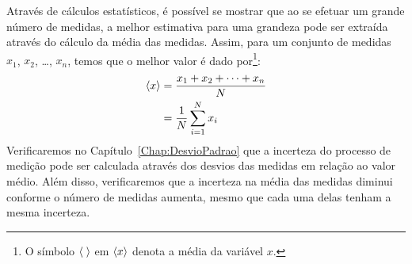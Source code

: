 \begin{description}
Através de cálculos estatísticos, é possível se mostrar que ao se efetuar um grande número de medidas, a melhor estimativa para uma grandeza pode ser extraída através do cálculo da média das medidas. Assim, para um conjunto de medidas $x_1$, $x_2$, \dots, $x_n$, temos que o melhor valor é dado por\footnote{O símbolo $\left\langle{\;}\right\rangle$ em $\left\langle{x}\right\rangle$ denota a média da variável $x$.}:
\begin{align}
	\left\langle{x}\right\rangle &= \frac{x_1 + x_2 + \dots + x_n}{N} \\
		&= \frac{1}{N}\sum_{i=1}^{N} x_i
\end{align}
%
Verificaremos no Capítulo~\ref{Chap:DesvioPadrao} que a incerteza do processo de medição pode ser calculada através dos desvios das medidas em relação ao valor médio. Além disso, verificaremos que a incerteza na média das medidas diminui conforme o número de medidas aumenta, mesmo que cada uma delas tenham a mesma incerteza.





\end{description}
